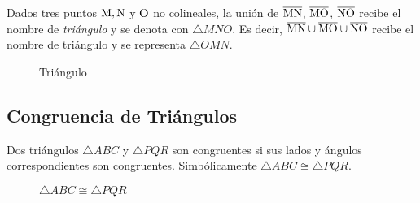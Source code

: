 \begin{definition}
    Dados tres puntos $\rm M,N$ y $\rm O$ no colineales, la unión de $\overline{\rm MN}$, $\overline{\rm MO}$, $\overline{\rm NO}$ recibe el nombre de \textit{triángulo} y se denota con $\triangle{MNO}$. Es decir, $\overline{\rm MN} \cup \overline{\rm MO} \cup \overline{\rm NO}$ recibe el nombre de triángulo y se representa $\triangle{OMN}$.

    \begin{figure}[!h]
        \centering
        
        \caption{Triángulo}
        \label{fig:triangle}
    \end{figure}
    
\end{definition}

\subsection{Congruencia de Triángulos}

\begin{definition}
    Dos triángulos $\triangle{ABC}$ y $\triangle{PQR}$ son congruentes si sus lados y ángulos correspondientes son congruentes. Simbólicamente $\triangle{ABC} \cong \triangle{PQR}$.

    \begin{figure}[h!]

        \centering

        \begin{subfigure}[b]{.5\textwidth}
            \centering
            
            \label{fig:triag-congruence-1}
        \end{subfigure}%
        \begin{subfigure}[b]{.5\textwidth}
            \centering
            
            \label{fig:triag-congruence-2}
        \end{subfigure}

        \centering
        \caption{$\triangle{ABC} \cong \triangle{PQR}$}
        \label{fig:triang-congruence}
        
    \end{figure}    
    
\end{definition}

